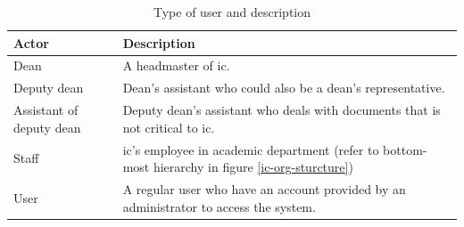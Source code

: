 \begin{table}
	\centering
	\caption{Type of user and description}
	\label{tbl:actor-description}
	\begin{tabular}{|l|L{7.5cm}|}
		\hline
		Actor & Description \\
		\hline
		Dean & A headmaster of \gls{ic}. \\
		Deputy dean & Dean's assistant who could also be a dean's representative. \\
		Assistant of deputy dean & Deputy dean's assistant who deals with documents that is not critical to \gls{ic}. \\
		Staff & \gls{ic}'s employee in academic department (refer to bottom-most hierarchy in figure \ref{ic-org-sturcture}) \\
		User & A regular user who have an account provided by an administrator to access the system. \\
		\hline
	\end{tabular}
\end{table}

\newcommand{\alreadylogin}{Have already logged in to the system}
\newcommand{\allICPersonel}{
	\begin{itemize}
		\item Dean
		\item Deputy dean
		\item Assistant of deputy dean
		\item Staff
	\end{itemize}
}

